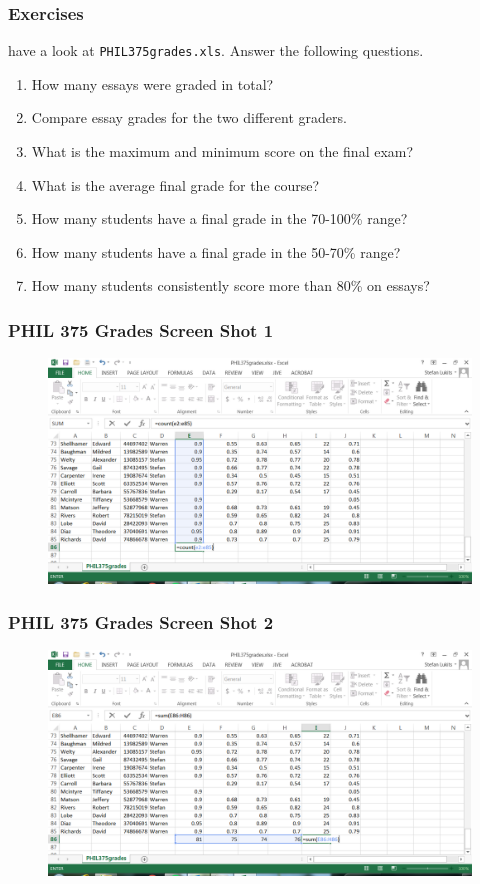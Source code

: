 \documentclass[xcolor=dvipsnames]{beamer}
\begin{document}
\begin{frame}
  \frametitle{Exercises}
have a look at \texttt{PHIL375grades.xls}. Answer the following questions.
  \begin{enumerate}
  \item<1-> How many essays were graded in total?
  \item<2-> Compare essay grades for the two different graders.
  \item<3-> What is the maximum and minimum score on the final exam?
  \item<4-> What is the average final grade for the course?
  \item<5-> How many students have a final grade in the 70-100\% range?
  \item<6-> How many students have a final grade in the 50-70\% range?
  \item<7-> How many students consistently score more than 80\% on essays?
  \end{enumerate}
\end{frame}

\begin{frame}
  \frametitle{PHIL 375 Grades Screen Shot 1}
  \begin{figure}[h]
    \includegraphics[scale=.42]{./e01.PNG}
  \end{figure}
\end{frame}

\begin{frame}
  \frametitle{PHIL 375 Grades Screen Shot 2}
  \begin{figure}[h]
    \includegraphics[scale=.42]{./e02.PNG}
  \end{figure}
\end{frame}
\end{document}
